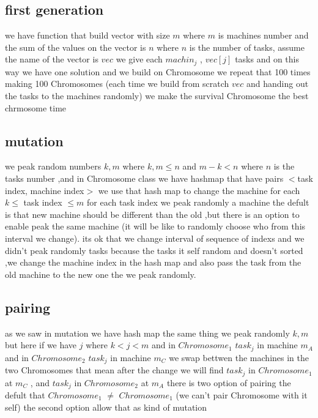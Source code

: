 \documentclass[11pt,fullpage]{article}
\begin{document}
\subsection{first generation}
we have function that build vector with size $m$ where $m$ is machines number and the sum of the values on the vector is $n$ where $n$ is the number of tasks, assume the name of the vector is $vec$ we give each $machin_j$ , $vec[j]$ tasks and on this way we have one solution and we build on Chromosome we repeat that 100 times making 100 Chromosomes (each time we build from scratch  $vec$ and handing out the tasks to the machines randomly) we make the survival Chromosome the best chrmosome  time
\subsection{mutation}
we peak random numbers $k,m$ where $k,m \leq n$ and $m-k <n$ where $n$ is the tasks number ,and in Chromosome class we have hashmap that have pairs $<$task index, machine index$>$ we use that hash map to change the machine for each $k\leq$ task index $\leq m$ for each task index we peak randomly a machine the defult is that new machine should be different than the old ,but there is an option to enable peak the same machine (it will be like to randomly choose who from this interval we change).\newline
its ok that we  change   interval of sequence of indexs and we didn't  peak randomly tasks because the tasks it self random and doesn't sorted ,we change the machine index in the hash map and also pass the task from the old machine to the new one the we peak randomly.\newline
 \subsection{pairing}
as we saw in mutation we have hash map the same thing we peak randomly $k,m$ but here if we have $j$ where $k<j<m$ and in $Chromosome_1$  $task_j$ in machine $m_A$ and in $Chromosome_2$  $task_j$ in machine $m_C$ we swap bettwen the machines in the two Chromosomes that mean after the change we will find $task_j$ in $Chromosome_1$ at $m_C$ , and $task_j$ in $Chromosome_2$ at $m_A$
there is two option of pairing the defult that $Chromosome_1$ $\neq$  $Chromosome_1$ (we can't pair Chromosome with it self) the second option allow that as kind of mutation
\end{document}
